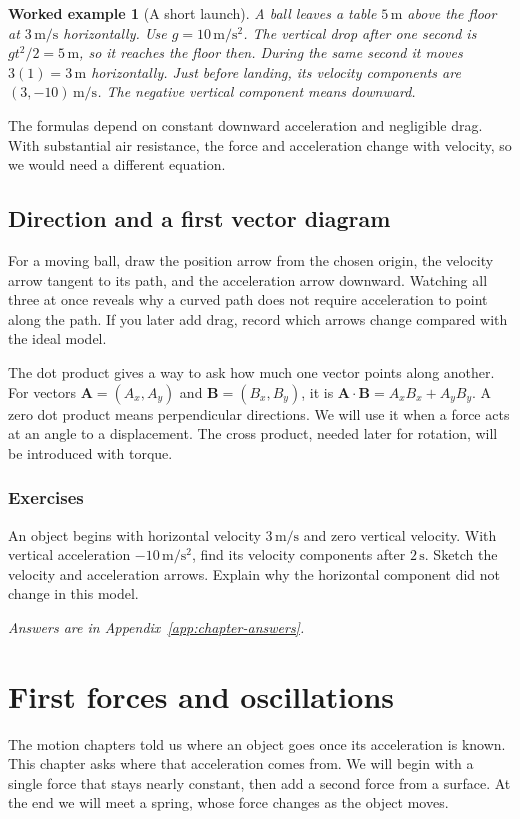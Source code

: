 \documentclass[11pt,oneside]{book}
\newcommand{\vect}[1]{\boldsymbol{#1}}
\theoremstyle{reviewstyle}
\newtheorem{example}{Worked example}[chapter]
\newcommand{\learningcheck}[1]{\subsection*{Exercises}\noindent #1\par\smallskip\noindent\emph{Answers are in Appendix~\ref{app:chapter-answers}.}}
\begin{document}
\begin{example}[A short launch]
A ball leaves a table $5\,\mathrm m$ above the floor at $3\,\mathrm{m/s}$ horizontally. Use $g=10\,\mathrm{m/s^2}$. The vertical drop after one second is $gt^2/2=5\,\mathrm m$, so it reaches the floor then. During the same second it moves $3(1)=3\,\mathrm m$ horizontally. Just before landing, its velocity components are $(3,-10)\,\mathrm{m/s}$. The negative vertical component means downward.
\end{example}

The formulas depend on constant downward acceleration and negligible drag. With substantial air resistance, the force and acceleration change with velocity, so we would need a different equation.

\section{Direction and a first vector diagram}
For a moving ball, draw the position arrow from the chosen origin, the velocity arrow tangent to its path, and the acceleration arrow downward. Watching all three at once reveals why a curved path does not require acceleration to point along the path. If you later add drag, record which arrows change compared with the ideal model.

The dot product gives a way to ask how much one vector points along another. For vectors $\vect A=(A_x,A_y)$ and $\vect B=(B_x,B_y)$, it is $\vect A\cdot\vect B=A_xB_x+A_yB_y$. A zero dot product means perpendicular directions. We will use it when a force acts at an angle to a displacement. The cross product, needed later for rotation, will be introduced with torque.

\learningcheck{An object begins with horizontal velocity $3\,\mathrm{m/s}$ and zero vertical velocity. With vertical acceleration $-10\,\mathrm{m/s^2}$, find its velocity components after $2\,\mathrm s$. Sketch the velocity and acceleration arrows. Explain why the horizontal component did not change in this model.}

\chapter{First forces and oscillations}
The motion chapters told us where an object goes once its acceleration is known. This chapter asks where that acceleration comes from. We will begin with a single force that stays nearly constant, then add a second force from a surface. At the end we will meet a spring, whose force changes as the object moves.
\end{document}
